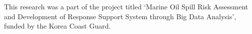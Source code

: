 \documentclass[sigconf]{acmart}
\begin{document}




\maketitle





\begin{acks}
This research was a part of the project titled `Marine Oil Spill Risk Assessment and Development of Response Support System through Big Data Analysis', funded by the Korea Coast Guard.
\end{acks}



% 

\end{document}
